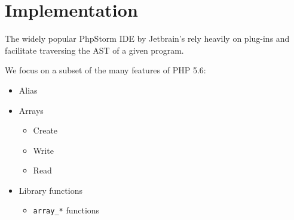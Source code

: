 \section{Implementation}
The widely popular PhpStorm IDE by Jetbrain's rely heavily on plug-ins and facilitate traversing the AST of a given program.

We focus on a subset of the many features of PHP 5.6:

\begin{itemize}
\item Alias
\item Arrays
\begin{itemize}
\item Create
\item Write
\item Read
\end{itemize}

\item Library functions
\begin{itemize}
\item  \texttt{array\_*} functions
\end{itemize}
\end{itemize}


